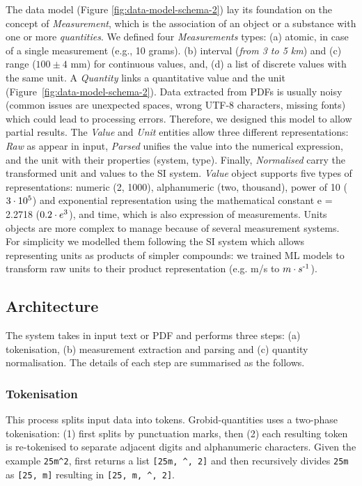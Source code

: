 \documentclass[sigconf]{acmart}
\begin{document}
The data model (Figure \ref{fig:data-model-schema-2}) lay its foundation on the concept of \textit{Measurement}, which is the association of an object or a substance with one or more \textit{quantities}. We defined four \textit{Measurements} types: (a) atomic, in case of a single measurement (e.g., 10 grams). (b) interval (\textit{from 3 to 5 km}) and (c) range ($100 \pm 4$ mm) for continuous values, and, (d) a list of discrete values with the same unit. A \textit{Quantity} links a quantitative value and the unit (Figure~\ref{fig:data-model-schema-2}). 
Data extracted from PDFs is usually noisy (common issues are unexpected spaces, wrong UTF-8 characters, missing fonts) which could lead to processing errors. Therefore, we designed this model to allow partial results. The \textit{Value} and \textit{Unit} entities allow three different representations: \textit{Raw} as appear in input, \textit{Parsed} unifies the value into the numerical expression, and the unit with their properties (system, type). Finally, \textit{Normalised} carry the transformed unit and values to the SI system. \textit{Value} object supports five types of representations: numeric (2, 1000), alphanumeric (two, thousand), power of 10 ($3\cdot10\textsuperscript{5}$) and exponential representation using the mathematical constant e = 2.2718 ($0.2\cdot e\textsuperscript{3}$), and time, which is also expression of measurements. Units objects are more complex to manage because of several measurement systems. For simplicity we modelled them following the SI system which allows representing units as products of simpler compounds: we trained ML models to transform raw units to their product representation (e.g. m/s to $m \cdot s\textsuperscript{-1}$).

\subsection{Architecture}
The system takes in input text or PDF and performs three steps: (a) tokenisation, (b) measurement extraction and parsing and (c) quantity normalisation. The details of each step are summarised as the follows.

\subsubsection{Tokenisation}
This process splits input data into tokens. Grobid-quantities uses a two-phase tokenisation: (1) first splits by punctuation marks, then (2) each resulting token is re-tokenised to separate adjacent digits and alphanumeric characters. Given the example \texttt{25m\^{}2}, first returns a list \texttt{[25m, \^{}, 2]} and then recursively divides \texttt{25m} as \texttt{[25, m]}  resulting in \texttt{[25, m, \^{}, 2]}.
\end{document}
